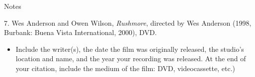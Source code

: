 \begin{center}{Notes}\end{center} 

\begin{singlespace}
\noindent\hspace{1.2cm}7. Wes Anderson and
Owen Wilson, \emph{Rushmore}, directed by Wes Anderson (1998, Burbank: Buena
Vista International, 2000), DVD.
\end{singlespace}

\begin{itemize}\item Include the writer(s), the date the film was originally
released, the studio's location and name, and the year your recording was
released. At the end of your citation, include the medium of the film: DVD,
videocassette, etc.)\end{itemize}




